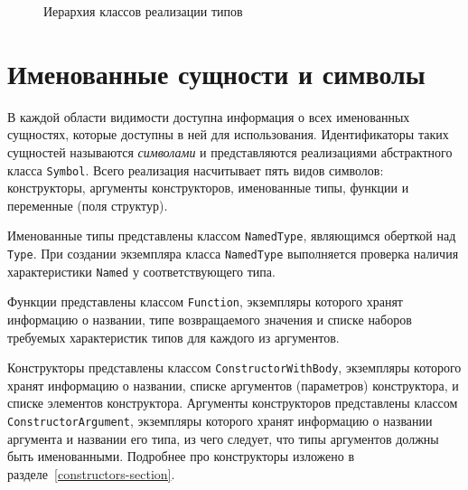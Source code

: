 \documentclass[times,specification,annotation]{style/itmo-student-thesis/itmo-student-thesis}
\begin{document}
\begin{figure}[!h]
\caption{Иерархия классов реализации типов}\label{type-classes-hierarchy}
\centering
{}%

\end{figure}

\section{Именованные сущности и символы}

В каждой области видимости доступна информация о всех именованных сущностях, которые доступны в ней для использования. Идентификаторы таких сущностей называются \textit{символами} и представляются реализациями абстрактного класса \texttt{Symbol}. Всего реализация насчитывает пять видов символов: конструкторы, аргументы конструкторов, именованные типы, функции и переменные (поля структур). 

Именованные типы представлены классом \texttt{NamedType}, являющимся оберткой над \texttt{Type}. При создании экземпляра класса \texttt{NamedType} выполняется проверка наличия характеристики \texttt{Named} у соответствующего типа.

Функции представлены классом \texttt{Function}, экземпляры которого хранят информацию о названии, типе возвращаемого значения и списке наборов требуемых характеристик типов для каждого из аргументов.

Конструкторы представлены классом \texttt{ConstructorWithBody}, экземпляры которого хранят информацию о названии, списке аргументов (параметров) конструктора, и списке элементов конструктора. Аргументы конструкторов представлены классом \texttt{ConstructorArgument}, экземпляры которого хранят информацию о названии аргумента и названии его типа, из чего следует, что типы аргументов должны быть именованными. Подробнее про конструкторы изложено в разделе~\ref{constructors-section}.
\end{document}
